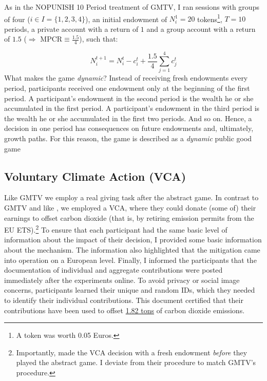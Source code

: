 \documentclass[
  authoryear,
  preprint,
  3p]{elsarticle}
\begin{document}
As in the NOPUNISH 10 Period treatment of GMTV, I ran sessions with
groups of four (\(i \in I=\{1,2,3,4\}\)), an initial endowment of
\(N_i^1 = 20\) tokens\footnote{A token was worth 0.05 Euros.}, \(T=10\)
periods, a private account with a return of \(1\) and a group account
with a return of \(1.5\) (\(\Rightarrow\) MPCR\(\equiv \frac{1.5}{4}\)),
such that:

\[
N_i^{t+1}=N_i^t - c_i^t + \frac{1.5}{4}\sum_{j=1}^4 c_j^t
\] What makes the game \emph{dynamic}? Instead of receiving fresh
endowments every period, participants received one endowment only at the
beginning of the first period. A participant's endowment in the second
period is the wealth he or she accumulated in the first period. A
participant's endowment in the third period is the wealth he or she
accumulated in the first two periods. And so on. Hence, a decision in
one period has consequences on future endowments and, ultimately, growth
paths. For this reason, the game is described as a \emph{dynamic} public
good game

\hypertarget{voluntary-climate-action-vca}{%
\subsection{Voluntary Climate Action
(VCA)}\label{voluntary-climate-action-vca}}

Like GMTV we employ a real giving task after the abstract game. In
contrast to GMTV and like \citet{GKLS2020}, we employed a VCA, where
they could donate (some of) their earnings to offset carbon dioxide
(that is, by retiring emission permits from the EU ETS).\footnote{Importantly,
  \citet{GKLS2020} made the VCA decision with a fresh endowment
  \emph{before} they played the abstract game. I deviate from their
  procedure to match GMTV's procedure.} To ensure that each participant
had the same basic level of information about the impact of their
decision, I provided some basic information about the mechanism. The
information also highlighted that the mitigation came into operation on
a European level. Finally, I informed the participants that the
documentation of individual and aggregate contributions were posted
immediately after the experiments online. To avoid privacy or social
image concerns, participants learned their unique and random IDs, which
they needed to identify their individual contributions. This document
certified that their contributions have been used to offset
\href{https://www.compensators.org/compensatelist/?searchterm=stefan+traub}{1.82
tons} of carbon dioxide emissions.
\end{document}
